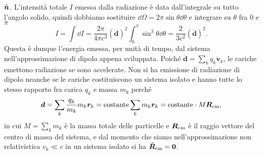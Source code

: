 $\hat{\bm{n}}$.  L'intensità totale $I$ emessa dalla radiazione è data
dall'integrale su tutto l'angolo solido, quindi dobbiamo sostituire
$\dd\Omega = 2\pi \sin\theta \dd\theta$ e integrare su $\theta$ fra $0$ e $\pi$
\begin{equation}
  \label{eq:energia-dipolo}
  I = \int \dd I = \frac{2\pi}{4\pi c^{3}} (\ddot{\bm{d}})^{2} \int_{0}^{\pi}
  \sin^{3}\theta \dd\theta = \frac{2}{3c^{2}}(\ddot{\bm{d}})^{2}.
\end{equation}
Questa è dunque l'energia emessa, per unità di tempo, dal sistema
nell'approssimazione di dipolo appena sviluppata.  Poiché
$\ddot{\bm{d}} = \sum_{k} q_{k} \dot{\bm{v}}_{k}$, le cariche emettono
radiazione se sono accelerate.  Non si ha emissione di radiazione di dipolo
neanche se le cariche costituiscono un sistema isolato e hanno tutte lo stesso
rapporto fra carica $q_{k}$ e massa $m_{k}$ perché
\begin{equation}
  \bm{d} = \sum_{k} \frac{q_{k}}{m_{k}} m_{k} \bm{r}_{k} = \text{costante}
  \sum_{k} m_{k} \bm{r}_{k} = \text{costante} \cdot M \bm{R}_{\textup{cm}},
\end{equation}
in cui $M = \sum_{k} m_{k}$ è la massa totale delle particelle e
$\bm{R}_{\textup{cm}}$ è il raggio vettore del centro di massa del sistema, e
dal momento che siamo nell'approssimazione non relativistica $v_{k} \ll c$ in un
sistema isolato si ha $\ddot{\bm{R}}_{\textup{cm}} = \bm{0}$.

